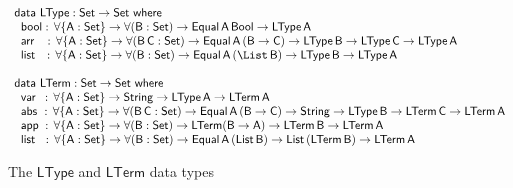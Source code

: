 \documentclass[sigplan,screen]{acmart}
\begin{document}
\begin{figure*}[t]

\begin{adjustbox}{varwidth=7.3in, max width=7.1in, margin=-0.0in 0in
      -0.2in 0in, center} 

{\small
\[\begin{array}{l}
\mathsf{data\ LType : Set \to Set\ where}\\
\mathsf{\;\;bool :\, \forall \{A : Set\} \to \forall (B : Set) \to Equal\,A\,Bool
  \to LType\,A}\\ 
\mathsf{\;\;arr\;\;\; :\, \forall \{A : Set\} \to \forall (B\,C : Set) \to
  Equal\,A\,(B \to C) \to LType\,B \to LType\,C \to LType\,A}\\ 
  \mathsf{\;\;list\,\;\; :\,  \forall \{A : Set\} \to\forall (B : Set) \to
    Equal\,A\,(\List\,B) \to LType\,B \to LType\,A}\\
  \\
\mathsf{data\ LTerm : Set \to Set\ where}\\
\mathsf{\;\;var\,\,\,:\,  \forall \{A : Set\} \to String \to LType\,A \to
  LTerm\,A} \\  
\mathsf{\;\;abs\,\, :\,  \forall \{A : Set\} \to \forall (B\,C : Set) \to
  Equal\,A\,(B \to C) \to String \to LType\,B \to LTerm\,C \to
  LTerm\,A}\\ 
  \mathsf{\;\;app\; :\,  \forall \{A : Set\} \to \forall (B : Set) \to
    LTerm (B \to A) \to LTerm\,B \to LTerm\,A} \\ 
  \mathsf{\;\;list\;\,\, :\,  \forall \{A : Set\} \to \forall (B : Set) \to
    Equal\,A\,(List\,B) \to List\,(LTerm\,B) \to LTerm\,A} 
\end{array}\]}

\vspace*{-0.1in}

\caption{The $\mathsf{LType}$ and $\mathsf{LTerm}$ data
  types}\label{fig:type-and-term}
\end{adjustbox}
\end{figure*}
\end{document}
